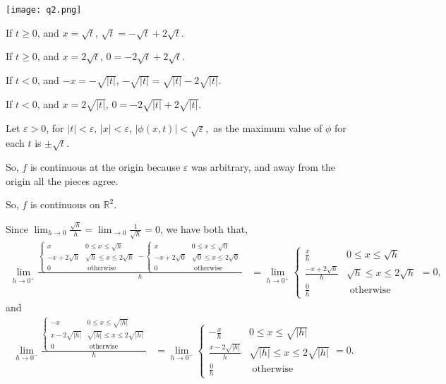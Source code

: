 \documentclass{article}
\newcommand\R{\mathbb{R}}
\begin{document}
\texttt{[image: q2.png]}


If $t\geq 0$, and $x = \sqrt{t}$, $\sqrt{t} = -\sqrt{t}+2\sqrt{t}$.

If $t\geq 0$, and $x = 2\sqrt{t}$, $0 = -2\sqrt{t}+2\sqrt{t}$.

If $t <0 $, and $-x = -\sqrt{|t|}$, $-\sqrt{|t|} =
\sqrt{|t|}-2\sqrt{|t|}$.

If $t < 0$, and $x = 2\sqrt{|t|}$, $0 = -2\sqrt{|t|}+2\sqrt{|t|}$.

Let $\varepsilon >0$, for $|t|<\varepsilon$, $|x|<\varepsilon$,
$|\phi(x,t)| < \sqrt{\varepsilon},$ as the maximum value of $\phi$ for
each $t$ is $\pm \sqrt{t}$.

So, $f$ is continuous at the origin because $\varepsilon$ was
arbitrary, and away from the origin all the pieces agree.

So, $f$ is
continuous on $\R^2$.

Since $\lim_{h\rightarrow 0} \frac{\sqrt{h}}{h} = \lim_{\rightarrow
  0}\frac{1}{\sqrt{h}} = 0$, we have both that,
\begin{align*}
 \lim_{h\rightarrow 0^+} \frac{\begin{cases}x & 0\leq x
      \leq \sqrt{h} \\ -x+2\sqrt{h} & \sqrt{h}\leq x \leq 2\sqrt{h}\\
      0 &\text{ otherwise}\end{cases} -\begin{cases}x & 0\leq x
      \leq \sqrt{0} \\ -x+2\sqrt{0} & \sqrt{0}\leq x \leq 2\sqrt{0}\\
      0 &\text{ otherwise}\end{cases}}{h}
               &= \lim_{h\rightarrow 0^+} \begin{cases}\frac{x}{h} & 0\leq x
      \leq \sqrt{h} \\ \frac{-x+2\sqrt{h}}{h} & \sqrt{h}\leq x \leq 2\sqrt{h}\\
      \frac{0}{h} &\text{ otherwise}\end{cases} = 0,
\end{align*}
and
\begin{align*}
 \lim_{h\rightarrow 0^-} \frac{\begin{cases}-x & 0\leq x
      \leq \sqrt{|h|} \\ x-2\sqrt{|h|} & \sqrt{|h|}\leq x \leq 2\sqrt{|h|}\\
      0 &\text{ otherwise}\end{cases}}{h}
               &= \lim_{h\rightarrow 0^-} \begin{cases}-\frac{x}{h} & 0\leq x
      \leq \sqrt{|h|} \\ \frac{x-2\sqrt{|h|}}{h} & \sqrt{|h|}\leq x \leq 2\sqrt{|h|}\\
      \frac{0}{h} &\text{ otherwise}\end{cases} = 0.
\end{align*}
\end{document}
